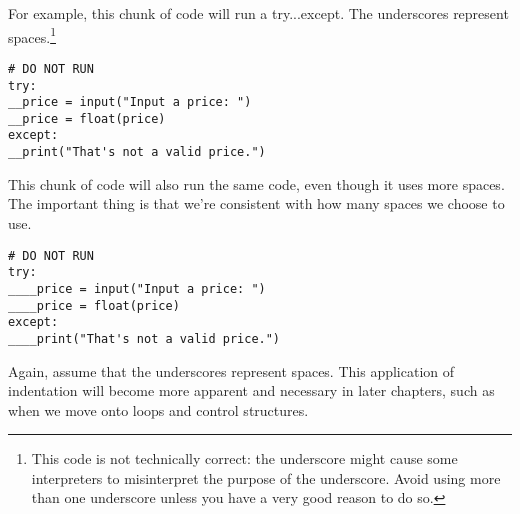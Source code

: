 For example, this chunk of code will run a try...except. The underscores represent spaces.\footnote{This code is not technically correct: the underscore might cause some interpreters to misinterpret the purpose of the underscore. Avoid using more than one underscore unless you have a very good reason to do so.}
\begin{lstlisting}[style=pippython]
# DO NOT RUN
try:
__price = input("Input a price: ")
__price = float(price)
except:
__print("That's not a valid price.")
\end{lstlisting}
This chunk of code will also run the same code, even though it uses more spaces. The important thing is that we're consistent with how many spaces we choose to use.
\begin{lstlisting}[style=pippython]
# DO NOT RUN
try:
____price = input("Input a price: ")
____price = float(price)
except:
____print("That's not a valid price.")
\end{lstlisting}
Again, assume that the underscores represent spaces. This application of indentation will become more apparent and necessary in later chapters, such as when we move onto loops and control structures.\par
